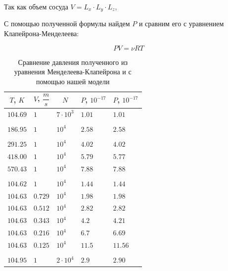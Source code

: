 \documentclass[twoside,twocolumn, 11pt]{article}
\theoremstyle{plain}
\theoremstyle{definition}
\begin{document}
Так как объем сосуда $V = L_x \cdot L_y \cdot L_z$,

\begin{center}
\end{center}

\indent С помощью полученной формулы найдем $P$ и сравним его с уравнением Клапейрона-Менделеева:

\[PV = \nu R T \]

\begin{table}[h!]
\centering
\label{Table 1}
\begin{tabular}{|l|l|l|l|l|}
\hline
\multicolumn{1}{|c|}{$T$, $K$} & \multicolumn{1}{c|}{$V$, $\dfrac{m}{s}$} & \multicolumn{1}{c|}{$N$} & \multicolumn{1}{c|}{$P$, $10^{-17}$} & \multicolumn{1}{c|}{$P$, $10^{-17}$} \\ \hline
$104.69$ & $1$ & $7\cdot 10^3$ & $1.01$ & $1.01$                                    \\
& & & &                                         \\
$186.95$ & $1$ & $10^4$ & $2.58$ & $2.58$                                    \\
& & & &                                         \\
$291.25$ & $1$ & $10^4$ & $4.02$ & $4.02$                                    \\
$418.00$ & $1$ & $10^4$ & $5.79$ & $5.77$                                    \\
$570.43$ & $1$ & $10^4$ & $7.88$ & $7.88$                                    \\
& & & &                                         \\
$104.62$ & $1$ & $10^4$ & $1.44$ & $1.44$                                  \\
$104.63$ & $0.729$ & $10^4$ & $1.98$ & $1.98$                                    \\
$104.63$ & $0.512$ & $10^4$ & $2.82$ & $2.82$                                    \\
$104.63$ & $0.343$ & $10^4$ & $4.2$ & $4.21$                                    \\
$104.63$ & $0.216$ & $10^4$ & $6.7$ & $6.69$                                    \\
$104.63$ & $0.125$ & $10^4$ & $11.5$ & $11.56$                                   \\
& & & &                                         \\
$104.95$ & $1$ & $2 \cdot 10^4$ & $2.9$ & $2.90$                                    \\ \hline
\end{tabular}
\caption{Сравнение давления полученного из уравнения Менделеева-Клапейрона и с помощью нашей модели}
\end{table}
\end{document}
